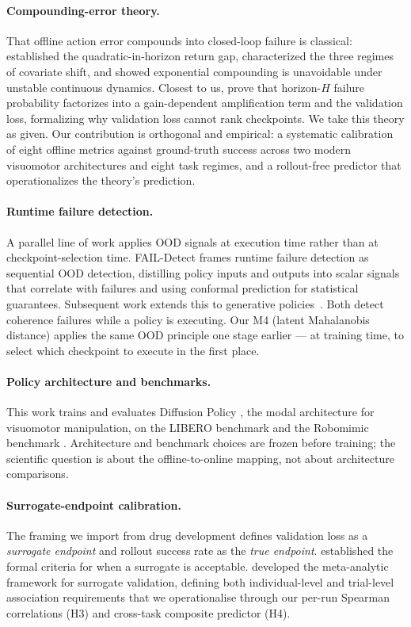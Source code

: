 \paragraph{Compounding-error theory.}
That offline action error compounds into closed-loop failure is classical: \citet{ross2010efficient,ross2011reduction}
established the quadratic-in-horizon return gap, \citet{spencer2021feedback} characterized the three
regimes of covariate shift, and \citet{simchowitz2025pitfalls} showed exponential compounding is
unavoidable under unstable continuous dynamics. Closest to us, \citet{tan2026gain} prove that
horizon-$H$ failure probability factorizes into a gain-dependent amplification term and the validation
loss, formalizing why validation loss cannot rank checkpoints. We take this theory as given. Our
contribution is orthogonal and empirical: a systematic calibration of eight offline metrics against
ground-truth success across two modern visuomotor architectures and eight task regimes, and a
rollout-free predictor that operationalizes the theory's prediction.

\paragraph{Runtime failure detection.}
A parallel line of work applies OOD signals at execution time rather than at checkpoint-selection time. FAIL-Detect \citep{faildetect2025} frames runtime failure detection as sequential OOD detection, distilling policy inputs and outputs into scalar signals that correlate with failures and using conformal prediction for statistical guarantees. Subsequent work extends this to generative policies~\citep{failpred2025}. Both detect coherence failures while a policy is executing. Our M4 (latent Mahalanobis distance) applies the same OOD principle one stage earlier --- at training time, to select which checkpoint to execute in the first place.

\paragraph{Policy architecture and benchmarks.}
This work trains and evaluates Diffusion Policy \citep{chi2023diffusion}, the modal
architecture for visuomotor manipulation, on the LIBERO benchmark \citep{liu2023libero} and
the Robomimic benchmark \citep{mandlekar2021}. Architecture and benchmark choices are
frozen before training; the scientific question is about the offline-to-online mapping, not
about architecture comparisons.

\paragraph{Surrogate-endpoint calibration.}
The framing we import from drug development defines validation loss as a
\emph{surrogate endpoint} and rollout success rate as the \emph{true endpoint}.
\citet{prentice1989} established the formal criteria for when a surrogate is acceptable.
\citet{buyse1998} developed the meta-analytic framework for surrogate validation, defining
both individual-level and trial-level association requirements that we operationalise through
our per-run Spearman correlations (H3) and cross-task composite predictor (H4).
